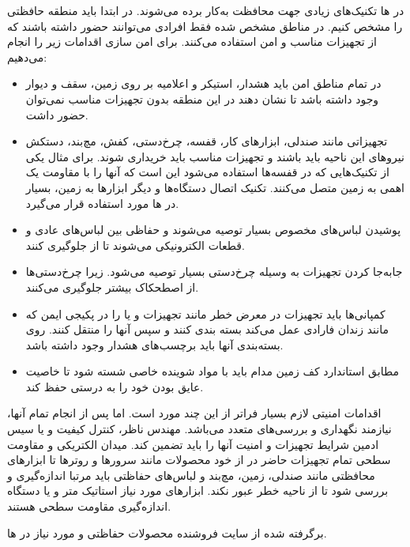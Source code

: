 \documentclass[a4paper]{article}
\begin{document}
در ها تکنیک‌های زیادی جهت محافظت  به‌کار برده می‌شوند. در ابتدا باید منطقه حافظتی را مشخص کنیم.
در مناطق مشخص شده فقط افرادی می‌توانند حضور داشته باشند که از تجهیزات مناسب و امن استفاده می‌کنند. برای امن سازی 
اقدامات زیر را انجام می‌دهیم:
\begin{itemize}
\item
در تمام مناطق امن  باید هشدار، استیکر و اعلامیه بر روی زمین، سقف و دیوار وجود داشته باشد تا نشان دهند در این منطقه
بدون تجهیزات مناسب نمی‌توان حضور داشت.
\item
تجهیزاتی مانند صندلی، ابزارهای کار، قفسه، چرخ‌دستی، کفش، مچ‌بند، دستکش نیروهای این ناحیه باید 
باشند و تجهیزات مناسب باید خریداری شوند. برای مثال یکی از تکنیک‌هایی که در قفسه‌ها استفاده می‌شود
این است که آنها را با مقاومت یک اهمی به زمین متصل می‌کنند.
تکنیک اتصال دستگاه‌ها و دیگر ابزارها به زمین، بسیار در ها مورد استفاده قرار می‌گیرد.
\item
پوشیدن لباس‌های مخصوص  بسیار توصیه می‌شوند و حفاظی بین لباس‌های عادی و قطعات الکترونیکی می‌شوند تا از 
جلوگیری کنند.
\item
جابه‌جا کردن تجهیزات به وسیله چرخ‌دستی بسیار توصیه می‌شود. زیرا چرخ‌دستی‌ها از اصطحکاک بیشتر جلوگیری می‌کنند.
\item
کمپانی‌ها باید تجهیزات در معرض خطر مانند تجهیزات  و یا  را در پکیجی ایمن که مانند زندان فارادی
عمل می‌کند بسته بندی کنند و سپس آنها را منتقل کنند. روی بسته‌بندی آنها باید برچسب‌های هشدار  وجود داشته باشد.
\item
مطابق استاندارد  کف زمین مدام باید با مواد شوینده خاصی شسته شود تا خاصیت عایق بودن خود را به درستی حفظ کند.
\end{itemize}
اقدامات امنیتی لازم بسیار فراتر از این چند مورد است. اما پس از انجام تمام آنها،  نیازمند نگهداری و بررسی‌های متعدد می‌باشد.
مهندس ناظر، کنترل کیفیت و یا سیس ادمین شرایط تجهیزات و امنیت آنها را باید تضمین کند. میدان الکتریکی و مقاومت سطحی
تمام تجهیزات حاضر در  از خود محصولات مانند سرورها و روترها تا ابزارهای محافظتی مانند صندلی، زمین، مچ‌بند و لباس‌های حفاظتی
باید مرتبا اندازه‌گیری و بررسی شود تا از ناحیه خطر عبور نکند. ابزارهای مورد نیاز استاتیک متر
و یا دستگاه اندازه‌گیری مقاومت سطحی
هستند.

برگرفته شده از سایت 
فروشنده محصولات حفاظتی و مورد نیاز در ها.
\end{document}
